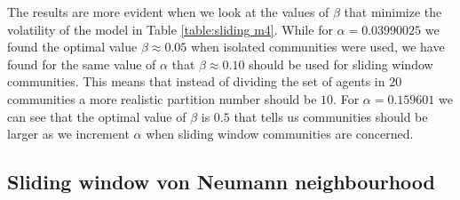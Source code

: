 The results are more evident when we look at the values of $\beta$ that minimize the volatility of the model in Table \ref{table:sliding m4}.
While for $\alpha=0.03990025$ we found the optimal value $\beta\approx 0.05$ when isolated communities were used, we have found for the same value of $\alpha$ that $\beta\approx 0.10$ should be used for sliding window communities.
This means that instead of dividing the set of agents in $20$ communities a more realistic partition number should be $10$.
For $\alpha=0.159601$ we can see that the optimal value of $\beta$ is $0.5$ that tells us communities should be larger as we increment $\alpha$ when sliding window communities are concerned.

\begin{table}
\tiny
\centering
{}
\caption{Sliding window neighbourhood table}
\label{table:sliding m4}
\end{table}

\subsection{Sliding window von Neumann neighbourhood}

